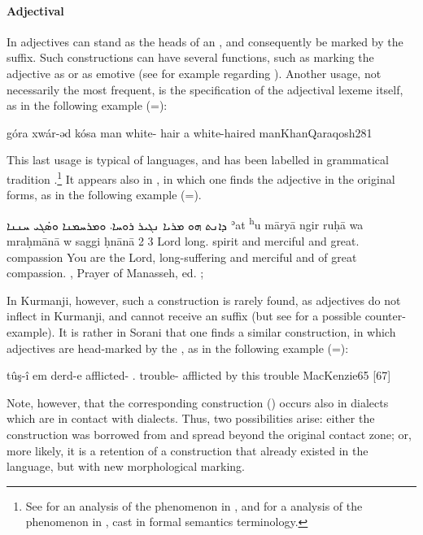 \paragraph{Adjectival \prims}

In  adjectives can stand as the heads of an , and consequently be marked by the \cst* suffix. Such constructions can have several functions, such as marking the adjective as \supr* or as {emotive} (see for example  regarding \JZax).  Another usage, not necessarily the most frequent, is the specification of the adjectival lexeme itself, as in the following example (=):

{góra xwár-əd kósa}
{man white-\cst{} hair}
{a white-haired man}{KhanQaraqosh}{281}

This last usage is typical of  languages, and has been labelled in  grammatical tradition .\footnote{See \citet{GoldenbergAdjectivization} for an analysis of the phenomenon in , and \citet{DoronAdjectival} for a analysis of the phenomenon in \MHeb, cast in formal semantics terminology.} It appears also in \Syr, in which one finds the adjective in the original  forms, as in the following example (=).

{ܕܐܢܬ ܗܘ ܡܪܝܐ ܢܓܝܪ ܪܘܚܐ܁ ܘܡܪܚܡܢܐ ܘܣ̇ܓܝ ܚܢܢܐ}
{ʾat \cb{}\textsuperscript{h}u māryā ngir ruḥā wa\cb{} mraḥmānā w\cb{} saggi ḥnānā} 
{2\masc{} \cb{}3\masc{} Lord long.\cst{} spirit and\cb{} merciful and\cb{} great.\cst{} compassion}
{You are the Lord, long-suffering and merciful and of great compassion.}
{\Pesh, Prayer of Manasseh, ed. \cite[A7]{BaarsSchneider};  \cite[217 (7a)]{GutmanVanPeursen}}


In Kurmanji, however, such a construction is rarely found, as adjectives do not inflect in Kurmanji, and cannot receive an \ez* suffix (but see  for a possible counter-example). It is rather in Sorani that one finds a similar construction, in which adjectives are head-marked by the \ez*, as in the following example (=):

{tûş-î em derd-e}
{afflicted-\ez{} \dem.\near{} trouble-}
{afflicted by this trouble}
{MacKenzie}{65 {[67]}}

Note, however, that the corresponding  construction () occurs also in dialects which are in contact with \Kur dialects. Thus, two possibilities arise: either the construction was borrowed from \Sor and spread beyond the original contact zone; or, more likely, it is a retention of a construction that already existed in the language, but with new morphological marking. 

